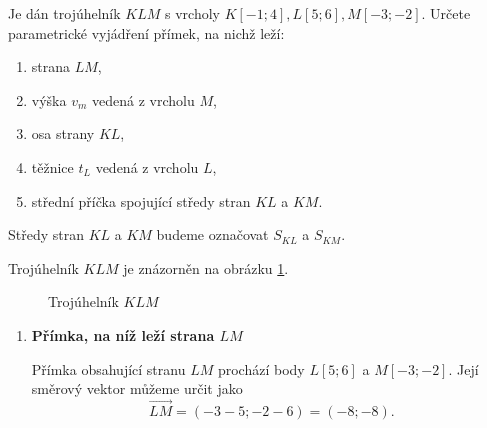 \begin{example}\label{exa:Parametric_lines_in_triangle}
    Je dán trojúhelník $KLM$ s vrcholy $K[-1;4], L[5;6], M[-3;-2]$.
    Určete parametrické vyjádření přímek, na nichž leží:

    \begin{enumerate}[label=\alph*)]
        \item strana $LM$,
        \item výška $v_m$ vedená z vrcholu $M$,
        \item osa strany $KL$,
        \item těžnice $t_L$ vedená z vrcholu $L$,
        \item střední příčka spojující středy stran $KL$ a $KM$.
    \end{enumerate}

    Středy stran $KL$ a $KM$ budeme označovat $S_{KL}$ a $S_{KM}$.

    Trojúhelník $KLM$ je znázorněn na obrázku \ref{fig:Parametric_lines_in_triangle}.

    
    \begin{figure}[H]
        \centering
        \caption{Trojúhelník $KLM$}
        \label{fig:Parametric_lines_in_triangle}
    \end{figure}

    \begin{enumerate}[label=\alph*), leftmargin=2em]

        \item \textbf{Přímka, na níž leží strana $LM$}

        Přímka obsahující stranu $LM$ prochází body $L[5;6]$ a
        $M[-3;-2]$. Její směrový vektor můžeme určit jako
        \[
            \overrightarrow{LM}
            =
            (-3-5;-2-6)
            =
            (-8;-8).
        \]


\end{enumerate}
\end{example}
